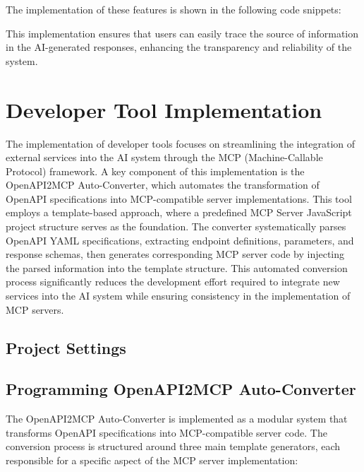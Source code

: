 \documentclass[../Main.tex]{subfiles}
\begin{document}
The implementation of these features is shown in the following code snippets:





This implementation ensures that users can easily trace the source of information in the AI-generated responses, enhancing the transparency and reliability of the system.

\section{Developer Tool Implementation}
\label{section:5.4_developer_tool_implementation}

The implementation of developer tools focuses on streamlining the integration of external services into the AI system through the MCP (Machine-Callable Protocol) framework. A key component of this implementation is the OpenAPI2MCP Auto-Converter, which automates the transformation of OpenAPI specifications into MCP-compatible server implementations. This tool employs a template-based approach, where a predefined MCP Server JavaScript project structure serves as the foundation. The converter systematically parses OpenAPI YAML specifications, extracting endpoint definitions, parameters, and response schemas, then generates corresponding MCP server code by injecting the parsed information into the template structure. This automated conversion process significantly reduces the development effort required to integrate new services into the AI system while ensuring consistency in the implementation of MCP servers.

\subsection{Project Settings}
\label{section:5.4.1_project_settings}
\subsection{Programming OpenAPI2MCP Auto-Converter}
\label{section:5.4.2_programming_openapi2mcp_auto_converter}

The OpenAPI2MCP Auto-Converter is implemented as a modular system that transforms OpenAPI specifications into MCP-compatible server code. The conversion process is structured around three main template generators, each responsible for a specific aspect of the MCP server implementation:
\end{document}
